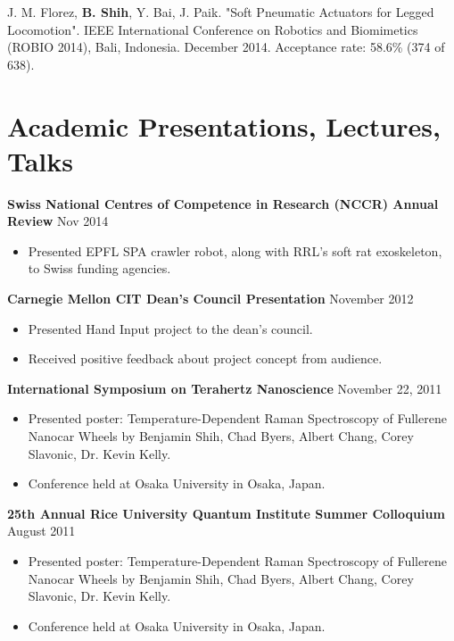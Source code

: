 \documentclass{res}
\begin{document}
J. M. Florez, {\bf B. Shih}, Y. Bai, J. Paik. "Soft Pneumatic Actuators for Legged Locomotion". IEEE International Conference on Robotics and Biomimetics (ROBIO 2014), Bali, Indonesia. December 2014. Acceptance rate: 58.6\% (374 of 638).





\vspace{-0.1in}
\section{Academic Presentations, Lectures, Talks}
\vspace{0.05in}

{\bf Swiss National Centres of Competence in Research (NCCR) Annual Review} \hfill Nov 2014
	\begin{itemize}
    		\item Presented EPFL SPA crawler robot, along with RRL's soft rat exoskeleton, to Swiss funding agencies.
	\end{itemize}

    {\bf Carnegie Mellon CIT Dean's Council Presentation} \hfill November 2012
    \begin{itemize}
    \item Presented Hand Input project to the dean's council.
    \item Received positive feedback about project concept from audience. 
    \end{itemize}

    {\bf International Symposium on Terahertz Nanoscience} \hfill November 22, 2011
    \begin{itemize}
    \item Presented poster: Temperature-Dependent Raman Spectroscopy of Fullerene Nanocar Wheels by Benjamin Shih, Chad Byers, Albert Chang, Corey Slavonic, Dr. Kevin Kelly.
    \item Conference held at Osaka University in Osaka, Japan.
    \end{itemize}

    {\bf 25th Annual Rice University Quantum Institute Summer Colloquium} \hfill August 2011
    \begin{itemize}
    \item Presented poster: Temperature-Dependent Raman Spectroscopy of Fullerene Nanocar Wheels by Benjamin Shih, Chad Byers, Albert Chang, Corey Slavonic, Dr. Kevin Kelly.
    \item Conference held at Osaka University in Osaka, Japan.
    \end{itemize}
\end{document}
